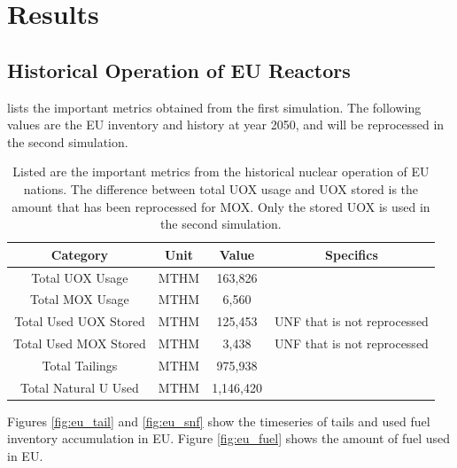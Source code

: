 \section{Results}

\subsection{Historical Operation of \gls{EU} Reactors}

 lists the important metrics
obtained from the first simulation. The following
values are the \gls{EU} inventory and history at year 2050,
and will be reprocessed in the second simulation.

\begin{table}[h]
	\centering
		\begin{tabular}{cccc}
			\hline
			\textbf{Category} & \textbf{Unit} & \textbf{Value} & \textbf{Specifics}\\ 
			\hline
			Total UOX Usage & MTHM & 163,826 &  \\ 
			Total MOX Usage & MTHM & 6,560 & \\ 
			Total Used UOX Stored & MTHM & 125,453 & \gls{UNF} that is not reprocessed\\ 
			Total Used  MOX Stored & MTHM & 3,438 & \gls{UNF} that is not reprocessed \\ 
			Total Tailings & MTHM & 975,938 & \\ 
			Total Natural U Used & MTHM & 1,146,420 & \\ \hline
		\end{tabular}
		\caption{Listed are the important metrics from the historical nuclear operation of \gls{EU} nations.
				 The difference between total \gls{UOX} usage and \gls{UOX} stored is the amount
				 that has been reprocessed for \gls{MOX}. Only the stored \gls{UOX} is used in the 
				 second simulation.}
		\label{tab:sim_result}
\end {table}
\FloatBarrier


Figures \ref{fig:eu_tail} and \ref{fig:eu_snf} show the 
timeseries of tails and used fuel inventory accumulation in \gls{EU}.
Figure \ref{fig:eu_fuel} shows the amount of fuel used in \gls{EU}.


